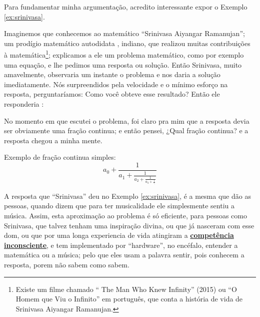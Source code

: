 Para fundamentar minha argumentação, acredito interessante expor o Exemplo \ref{ex:srinivasa}. 
\begin{example}
\label{ex:srinivasa}
Imaginemos que conhecemos ao matemático ``Srinivasa Aiyangar Ramanujan'';
um prodígio matemático autodidata \cite[pp. 1]{kanigel2016man}, indiano, que 
realizou muitas contribuições à matemática\footnote{Existe 
um filme chamado `` The Man Who Knew Infinity'' (2015) ou 
``O Homem que Viu o Infinito'' em português, que conta a história de vida de Srinivasa Aiyangar Ramanujan.};
explicamos a ele um problema  matemático, 
como por exemplo uma equação,
e  lhe pedimos uma resposta ou solução. 
Então Srinivasa, muito amavelmente, 
observaria um instante o problema e nos daria a solução imediatamente.
Nós surpreendidos pela velocidade e o mínimo esforço na resposta,
perguntaríamos: Como você obteve esse resultado? Então ele responderia \cite[pp. 235]{kanigel2016man}: 
\begin{citando}
No momento em que escutei o problema, 
foi claro pra mim que a resposta devia ser obviamente uma fração continua; 
e então pensei, ¿Qual fração continua? e a resposta chegou a minha mente. 
\end{citando}

Exemplo de fração continua simples:
\begin{equation}
a_{0}+{\frac {1}{a_{1}+{\frac {1}{a_{2}+{\frac {1}{a_{3}+{\frac {1}{\ddots }}}}}}}}
\end{equation}
\end{example}

A resposta que ``Srinivasa'' deu no Exemplo  \ref{ex:srinivasa}, 
é a mesma  que dão as pessoas, quando  dizem que para ter musicalidade ele simplesmente sentiu a música. 
Assim, esta aproximação ao problema é só eficiente, para pessoas como Srinivasa, 
que talvez tenham uma inspiração divina, 
ou que já nasceram com esse dom, ou que por uma longa experiencia de vida atingiram 
a \hyperref[ref:CompetenciaInconsciente]{\textbf{competência inconsciente}}, 
e tem implementado por ``hardware'', no encéfalo, entender a matemática ou a música; 
pelo que eles usam a palavra sentir, 
pois conhecem a resposta, porem não sabem como sabem. 

